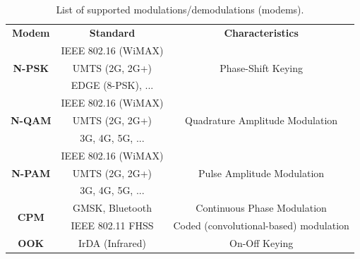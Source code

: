 \documentclass[11pt]{report}
\begin{document}
\begin{table}[htp]
  \centering
  \caption{List of supported modulations/demodulations (modems).}
  \label{tab:modems}
  {\footnotesize%
    \begin{tabular}{| c | c | c |}
      \hline
      \multirow{2}{*}{\textbf{Modem}}        & \multirow{2}{*}{\textbf{Standard}} & \multirow{2}{*}{\textbf{Characteristics}} \\
                                             &                                    &                                           \\
      \hline
      \multirow{3}{*}{\textbf{N-PSK}}        & IEEE 802.16 (WiMAX)                &                                           \\
                                             & UMTS (2G, 2G+)                     & Phase-Shift Keying                        \\
                                             & EDGE (8-PSK), ...                  &                                           \\
      \hline
      \multirow{3}{*}{\textbf{N-QAM}}        & IEEE 802.16 (WiMAX)                &                                           \\
                                             & UMTS (2G, 2G+)                     & Quadrature Amplitude Modulation           \\
                                             & 3G, 4G, 5G, ...                    &                                           \\
      \hline
      \multirow{3}{*}{\textbf{N-PAM}}        & IEEE 802.16 (WiMAX)                &                                           \\
                                             & UMTS (2G, 2G+)                     & Pulse Amplitude Modulation                \\
                                             & 3G, 4G, 5G, ...                    &                                           \\
      \hline
      \multirow{2}{*}{\textbf{CPM}}          & GMSK, Bluetooth                    & Continuous Phase Modulation               \\
                                             & IEEE 802.11 FHSS                   & Coded (convolutional-based) modulation    \\
      \hline
      \multirow{2}{*}{\textbf{OOK}}          & IrDA (Infrared)                    & On-Off Keying                             \\

\end{tabular}}
\end{table}
\end{document}

